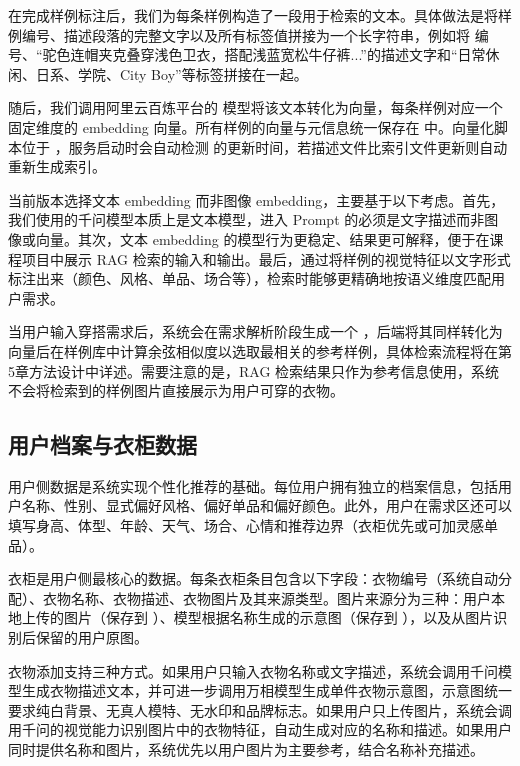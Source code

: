 \documentclass{applemlr}
\begin{document}
在完成样例标注后，我们为每条样例构造了一段用于检索的文本。具体做法是将样例编号、描述段落的完整文字以及所有标签值拼接为一个长字符串，例如将  编号、``驼色连帽夹克叠穿浅色卫衣，搭配浅蓝宽松牛仔裤...''的描述文字和``日常休闲、日系、学院、City Boy''等标签拼接在一起。

随后，我们调用阿里云百炼平台的  模型将该文本转化为向量，每条样例对应一个固定维度的 embedding 向量。所有样例的向量与元信息统一保存在  中。向量化脚本位于 ，服务启动时会自动检测  的更新时间，若描述文件比索引文件更新则自动重新生成索引。

当前版本选择文本 embedding 而非图像 embedding，主要基于以下考虑。首先，我们使用的千问模型本质上是文本模型，进入 Prompt 的必须是文字描述而非图像或向量。其次，文本 embedding 的模型行为更稳定、结果更可解释，便于在课程项目中展示 RAG 检索的输入和输出。最后，通过将样例的视觉特征以文字形式标注出来（颜色、风格、单品、场合等），检索时能够更精确地按语义维度匹配用户需求。

当用户输入穿搭需求后，系统会在需求解析阶段生成一个 ，后端将其同样转化为向量后在样例库中计算余弦相似度以选取最相关的参考样例，具体检索流程将在第5章方法设计中详述。需要注意的是，RAG 检索结果只作为参考信息使用，系统不会将检索到的样例图片直接展示为用户可穿的衣物。

\subsection{用户档案与衣柜数据}

用户侧数据是系统实现个性化推荐的基础。每位用户拥有独立的档案信息，包括用户名称、性别、显式偏好风格、偏好单品和偏好颜色。此外，用户在需求区还可以填写身高、体型、年龄、天气、场合、心情和推荐边界（衣柜优先或可加灵感单品）。

衣柜是用户侧最核心的数据。每条衣柜条目包含以下字段：衣物编号（系统自动分配）、衣物名称、衣物描述、衣物图片及其来源类型。图片来源分为三种：用户本地上传的图片（保存到 ）、模型根据名称生成的示意图（保存到 ），以及从图片识别后保留的用户原图。

衣物添加支持三种方式。如果用户只输入衣物名称或文字描述，系统会调用千问模型生成衣物描述文本，并可进一步调用万相模型生成单件衣物示意图，示意图统一要求纯白背景、无真人模特、无水印和品牌标志。如果用户只上传图片，系统会调用千问的视觉能力识别图片中的衣物特征，自动生成对应的名称和描述。如果用户同时提供名称和图片，系统优先以用户图片为主要参考，结合名称补充描述。
\end{document}
